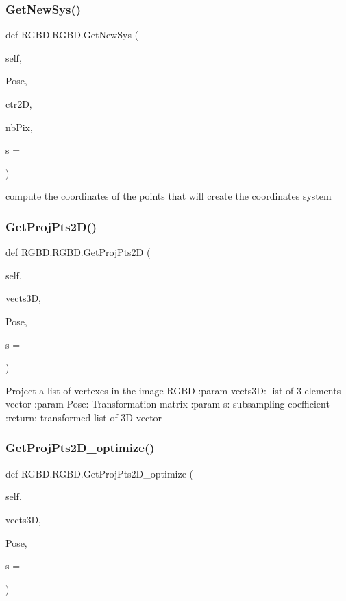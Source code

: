 \subsubsection{Get\+New\+Sys()}
{\footnotesize\ttfamily def R\+G\+B\+D.\+R\+G\+B\+D.\+Get\+New\+Sys (\begin{DoxyParamCaption}\item[{}]{self,  }\item[{}]{Pose,  }\item[{}]{ctr2D,  }\item[{}]{nb\+Pix,  }\item[{}]{s = {} }\end{DoxyParamCaption})}

\begin{DoxyVerb}compute the coordinates of the points that will create the coordinates system
\end{DoxyVerb}
 \mbox{\label{class_r_g_b_d_1_1_r_g_b_d_a58c29e9445dde3116abaf4ece69a5c71}} 
\subsubsection{Get\+Proj\+Pts2\+D()}
{\footnotesize\ttfamily def R\+G\+B\+D.\+R\+G\+B\+D.\+Get\+Proj\+Pts2D (\begin{DoxyParamCaption}\item[{}]{self,  }\item[{}]{vects3D,  }\item[{}]{Pose,  }\item[{}]{s = {} }\end{DoxyParamCaption})}

\begin{DoxyVerb}Project a list of vertexes in the image RGBD
:param vects3D: list of 3 elements vector
:param Pose: Transformation matrix
:param s: subsampling coefficient
:return: transformed list of 3D vector
\end{DoxyVerb}
 \mbox{\label{class_r_g_b_d_1_1_r_g_b_d_a9213368288cc80787b00a71927fc2ad1}} 
\subsubsection{Get\+Proj\+Pts2\+D\+\_\+optimize()}
{\footnotesize\ttfamily def R\+G\+B\+D.\+R\+G\+B\+D.\+Get\+Proj\+Pts2\+D\+\_\+optimize (\begin{DoxyParamCaption}\item[{}]{self,  }\item[{}]{vects3D,  }\item[{}]{Pose,  }\item[{}]{s = {} }\end{DoxyParamCaption})}


